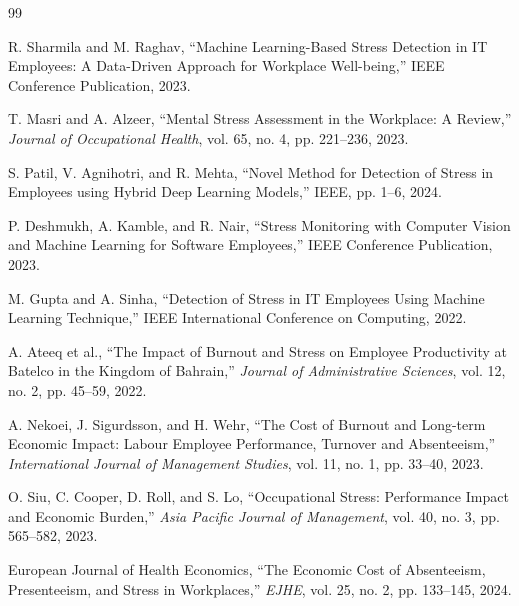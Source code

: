 \renewcommand{\bibname}{References}
\begin{thebibliography}{99}

R. Sharmila and M. Raghav, ``Machine Learning-Based Stress Detection in IT Employees: A Data-Driven Approach for Workplace Well-being,'' IEEE Conference Publication, 2023.

T. Masri and A. Alzeer, ``Mental Stress Assessment in the Workplace: A Review,'' \textit{Journal of Occupational Health}, vol. 65, no. 4, pp. 221--236, 2023.

S. Patil, V. Agnihotri, and R. Mehta, ``Novel Method for Detection of Stress in Employees using Hybrid Deep Learning Models,'' IEEE, pp. 1--6, 2024.

P. Deshmukh, A. Kamble, and R. Nair, ``Stress Monitoring with Computer Vision and Machine Learning for Software Employees,'' IEEE Conference Publication, 2023.

M. Gupta and A. Sinha, ``Detection of Stress in IT Employees Using Machine Learning Technique,'' IEEE International Conference on Computing, 2022.

A. Ateeq et al., ``The Impact of Burnout and Stress on Employee Productivity at Batelco in the Kingdom of Bahrain,'' \textit{Journal of Administrative Sciences}, vol. 12, no. 2, pp. 45--59, 2022.

A. Nekoei, J. Sigurdsson, and H. Wehr, ``The Cost of Burnout and Long-term Economic Impact: Labour Employee Performance, Turnover and Absenteeism,'' \textit{International Journal of Management Studies}, vol. 11, no. 1, pp. 33--40, 2023.

O. Siu, C. Cooper, D. Roll, and S. Lo, ``Occupational Stress: Performance Impact and Economic Burden,'' \textit{Asia Pacific Journal of Management}, vol. 40, no. 3, pp. 565--582, 2023.

European Journal of Health Economics, ``The Economic Cost of Absenteeism, Presenteeism, and Stress in Workplaces,'' \textit{EJHE}, vol. 25, no. 2, pp. 133--145, 2024.

\end{thebibliography}
